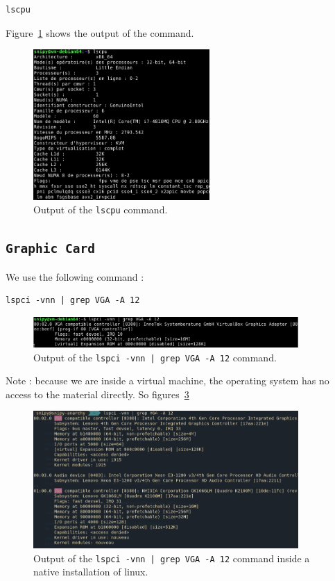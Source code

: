 \documentclass[a4paper,11pt]{report}
\begin{document}
\begin{verbatim}
lscpu
\end{verbatim}

Figure~\ref{fig:cpu} shows the output of the command.

\begin{figure}[ht]
  \centering
  \includegraphics[width=0.6\textwidth]{figures/cpu}
  \caption{\label{fig:cpu} Output of the \texttt{lscpu} command.}
\end{figure}

\subsection*{\texttt{Graphic Card}}
We use the following command :

\begin{verbatim}
lspci -vnn | grep VGA -A 12
\end{verbatim}

\begin{figure}[ht]
  \centering
  \includegraphics[width=0.9\textwidth]{figures/gc}
  \caption{\label{fig:gc} Output of the \texttt{lspci -vnn | grep VGA -A 12} command.}
\end{figure}

Note : because we are inside a virtual machine, the operating system has no
access to the material directly. So figures~\ref{fig:gc-nat}

\begin{figure}[ht]
  \centering
  \includegraphics[width=0.9\textwidth]{figures/gc_nat}
  \caption{\label{fig:gc-nat} Output of the \texttt{lspci -vnn | grep VGA -A 12}
    command inside a native installation of linux.}
\end{figure}
\end{document}
